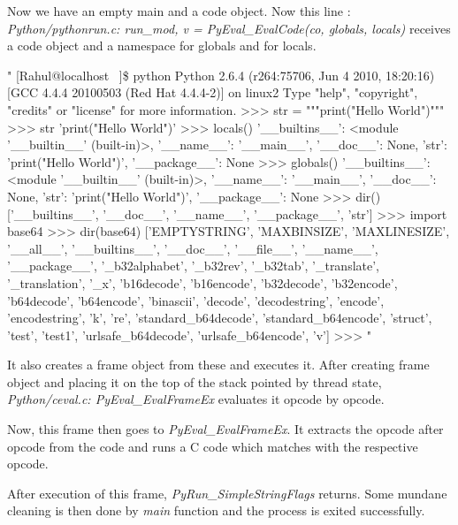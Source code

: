 \pagebreak
Now we have an empty main and a code object. Now this line : \textit{Python/pythonrun.c: run\_mod, v = PyEval\_EvalCode(co, globals, locals) } receives a code object and a namespace for globals and for locals. 
\begin{code}
"
[Rahul@localhost ~]\$ python
Python 2.6.4 (r264:75706, Jun  4 2010, 18:20:16) 
[GCC 4.4.4 20100503 (Red Hat 4.4.4-2)] on linux2
Type "help", "copyright", "credits" or "license" for more information.
>>> str = """print("Hello World")"""
>>> str
'print("Hello World")'
>>> locals()
{'__builtins__': <module '__builtin__' (built-in)>, '__name__': '__main__', '__doc__': 
None, 'str': 'print("Hello World")', '__package__': None}
>>> globals()
{'__builtins__': <module '__builtin__' (built-in)>, '__name__': '__main__', '__doc__': 
None, 'str': 'print("Hello World")', '__package__': None}
>>> dir()
['__builtins__', '__doc__', '__name__', '__package__', 'str']
>>> import base64
>>> dir(base64)
['EMPTYSTRING', 'MAXBINSIZE', 'MAXLINESIZE', '__all__', '__builtins__', '__doc__', 
'__file__', '__name__', '__package__', '_b32alphabet', '_b32rev', '_b32tab', 
'_translate', '_translation', '_x', 'b16decode', 'b16encode', 'b32decode', 'b32encode', 
'b64decode', 'b64encode', 'binascii', 'decode', 'decodestring', 'encode', 'encodestring', 
'k', 're', 'standard_b64decode', 'standard_b64encode', 'struct', 'test', 'test1', 
'urlsafe_b64decode', 'urlsafe_b64encode', 'v']
>>> 
"
\end{code}
It also creates a frame object from these and  executes it. After creating frame object and placing it on the top of the stack pointed by thread state, \textit{Python/ceval.c: PyEval\_EvalFrameEx} evaluates it opcode by opcode.

Now, this frame then goes to\textit{ PyEval\_EvalFrameEx}. It extracts the opcode after opcode from the code and runs a C code which matches with the respective opcode.

After execution of this frame, \textit{PyRun\_SimpleStringFlags} returns. Some mundane cleaning is then done by \textit{main} function and the process is exited successfully.
